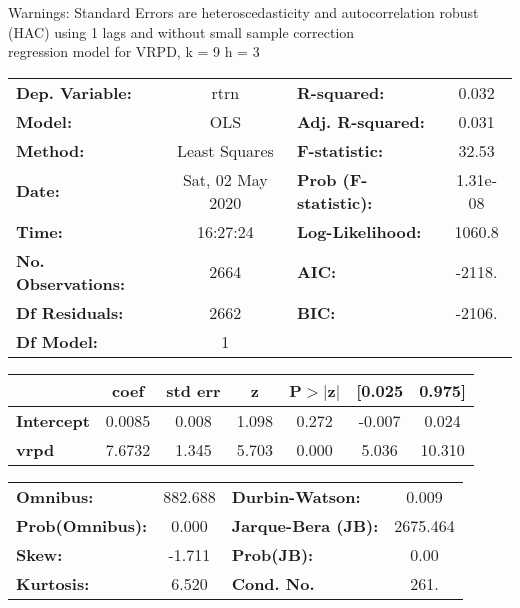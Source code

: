 Warnings: \newline
 [1] Standard Errors are heteroscedasticity and autocorrelation robust (HAC) using 1 lags and without small sample correction\\ 

regression model for VRPD, k = 9 h = 3\begin{center}
\begin{tabular}{lclc}
\toprule
\textbf{Dep. Variable:}    &       rtrn       & \textbf{  R-squared:         } &     0.032   \\
\textbf{Model:}            &       OLS        & \textbf{  Adj. R-squared:    } &     0.031   \\
\textbf{Method:}           &  Least Squares   & \textbf{  F-statistic:       } &     32.53   \\
\textbf{Date:}             & Sat, 02 May 2020 & \textbf{  Prob (F-statistic):} &  1.31e-08   \\
\textbf{Time:}             &     16:27:24     & \textbf{  Log-Likelihood:    } &    1060.8   \\
\textbf{No. Observations:} &        2664      & \textbf{  AIC:               } &    -2118.   \\
\textbf{Df Residuals:}     &        2662      & \textbf{  BIC:               } &    -2106.   \\
\textbf{Df Model:}         &           1      & \textbf{                     } &             \\
\bottomrule
\end{tabular}
\begin{tabular}{lcccccc}
                   & \textbf{coef} & \textbf{std err} & \textbf{z} & \textbf{P$> |$z$|$} & \textbf{[0.025} & \textbf{0.975]}  \\
\midrule
\textbf{Intercept} &       0.0085  &        0.008     &     1.098  &         0.272        &       -0.007    &        0.024     \\
\textbf{vrpd}      &       7.6732  &        1.345     &     5.703  &         0.000        &        5.036    &       10.310     \\
\bottomrule
\end{tabular}
\begin{tabular}{lclc}
\textbf{Omnibus:}       & 882.688 & \textbf{  Durbin-Watson:     } &    0.009  \\
\textbf{Prob(Omnibus):} &   0.000 & \textbf{  Jarque-Bera (JB):  } & 2675.464  \\
\textbf{Skew:}          &  -1.711 & \textbf{  Prob(JB):          } &     0.00  \\
\textbf{Kurtosis:}      &   6.520 & \textbf{  Cond. No.          } &     261.  \\
\bottomrule
\end{tabular}
\end{center}

